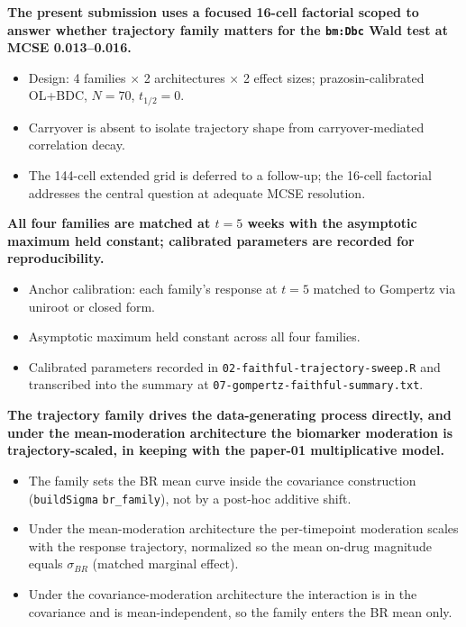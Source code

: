 \documentclass[
  11pt,
]{article}
\begin{document}
\textbf{The present submission uses a focused 16-cell factorial
scoped to answer whether trajectory family matters for the
\texttt{bm:Dbc} Wald test at MCSE 0.013--0.016.}

\begin{itemize}\setlength{\itemsep}{2pt}\setlength{\parskip}{0pt}
\item Design: 4 families $\times$ 2 architectures $\times$
  2 effect sizes; prazosin-calibrated OL+BDC, $N = 70$,
  $t_{1/2} = 0$.
\item Carryover is absent to isolate trajectory shape from
  carryover-mediated correlation decay.
\item The 144-cell extended grid is deferred to a follow-up;
  the 16-cell factorial addresses the central question at
  adequate MCSE resolution.
\end{itemize}

\textbf{All four families are matched at $t = 5$ weeks with
the asymptotic maximum held constant; calibrated parameters
are recorded for reproducibility.}

\begin{itemize}\setlength{\itemsep}{2pt}\setlength{\parskip}{0pt}
\item Anchor calibration: each family's response at $t = 5$
  matched to Gompertz via uniroot or closed form.
\item Asymptotic maximum held constant across all four families.
\item Calibrated parameters recorded in
  \texttt{02-faithful-trajectory-sweep.R} and transcribed into
  the summary at \texttt{07-gompertz-faithful-summary.txt}.
\end{itemize}

\textbf{The trajectory family drives the data-generating process
directly, and under the mean-moderation architecture the biomarker moderation is
trajectory-scaled, in keeping with the paper-01 multiplicative
model.}

\begin{itemize}\setlength{\itemsep}{2pt}\setlength{\parskip}{0pt}
\item The family sets the BR mean curve inside the covariance
  construction (\texttt{buildSigma} \texttt{br\_family}), not by
  a post-hoc additive shift.
\item Under the mean-moderation architecture the per-timepoint moderation scales
  with the response trajectory, normalized so the mean on-drug
  magnitude equals $\sigma_{BR}$ (matched marginal effect).
\item Under the covariance-moderation architecture the interaction is in the covariance
  and is mean-independent, so the family enters the BR mean only.
\end{itemize}
\end{document}
